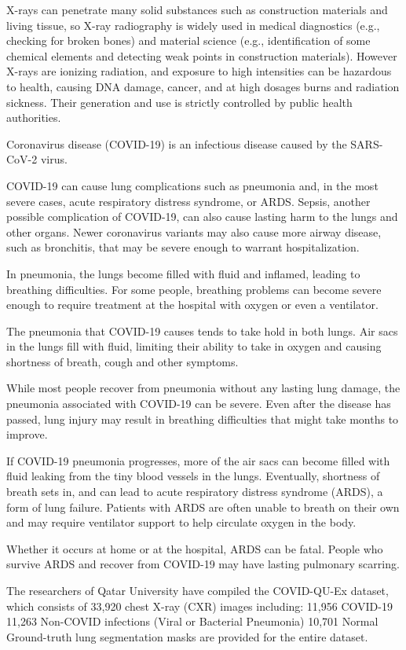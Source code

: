 \documentclass[twocolumn]{article}
\begin{document}
X-rays can penetrate many solid substances such as construction materials and living tissue, so X-ray radiography is widely used in medical diagnostics (e.g., checking for broken bones) and material science (e.g., identification of some chemical elements and detecting weak points in construction materials). However X-rays are ionizing radiation, and exposure to high intensities can be hazardous to health, causing DNA damage, cancer, and at high dosages burns and radiation sickness. Their generation and use is strictly controlled by public health authorities.

Coronavirus disease (COVID-19) is an infectious disease caused by the SARS-CoV-2 virus.

COVID-19 can cause lung complications such as pneumonia and, in the most severe cases, acute respiratory distress syndrome, or ARDS. Sepsis, another possible complication of COVID-19, can also cause lasting harm to the lungs and other organs. Newer coronavirus variants may also cause more airway disease, such as bronchitis, that may be severe enough to warrant hospitalization.

In pneumonia, the lungs become filled with fluid and inflamed, leading to breathing difficulties. For some people, breathing problems can become severe enough to require treatment at the hospital with oxygen or even a ventilator.

The pneumonia that COVID-19 causes tends to take hold in both lungs. Air sacs in the lungs fill with fluid, limiting their ability to take in oxygen and causing shortness of breath, cough and other symptoms.

While most people recover from pneumonia without any lasting lung damage, the pneumonia associated with COVID-19 can be severe. Even after the disease has passed, lung injury may result in breathing difficulties that might take months to improve.

If COVID-19 pneumonia progresses, more of the air sacs can become filled with fluid leaking from the tiny blood vessels in the lungs. Eventually, shortness of breath sets in, and can lead to acute respiratory distress syndrome (ARDS), a form of lung failure. Patients with ARDS are often unable to breath on their own and may require ventilator support to help circulate oxygen in the body.

Whether it occurs at home or at the hospital, ARDS can be fatal. People who survive ARDS and recover from COVID-19 may have lasting pulmonary scarring.

The researchers of Qatar University have compiled the COVID-QU-Ex dataset, which consists of 33,920 chest X-ray (CXR) images including:
11,956 COVID-19
11,263 Non-COVID infections (Viral or Bacterial Pneumonia)
10,701 Normal
Ground-truth lung segmentation masks are provided for the entire dataset.
\end{document}
